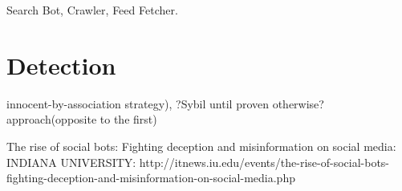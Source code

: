 \documentclass[twoside]{article}
\begin{document}
\begin{multicols}{2}
Search Bot, Crawler, Feed Fetcher.


\section{Detection}

innocent-by-association strategy), ?Sybil until proven otherwise? approach(opposite to the first)\cite{ferrara:2015}





The rise of social bots: Fighting deception and misinformation on social media: INDIANA UNIVERSITY: http://itnews.iu.edu/events/the-rise-of-social-bots-fighting-deception-and-misinformation-on-social-media.php






\end{multicols}
\end{document}

